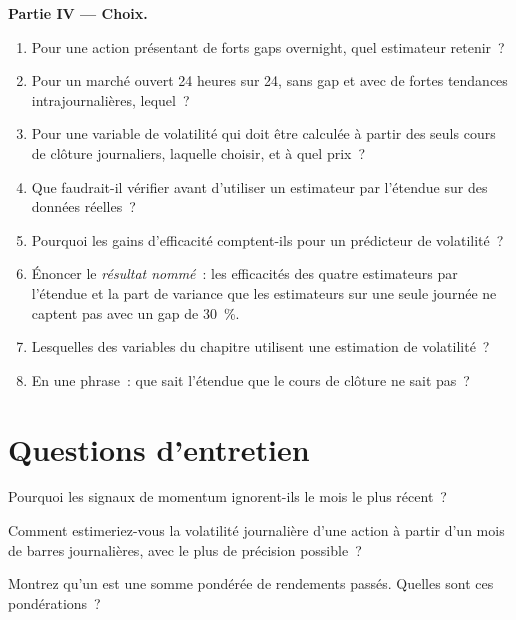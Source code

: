 \begin{problem}
\medskip\noindent\textbf{Partie IV --- Choix.}
\begin{enumerate}[resume]
\item Pour une action présentant de forts gaps overnight, quel estimateur retenir~?
\item Pour un marché ouvert 24 heures sur 24, sans gap et avec de fortes tendances intrajournalières, lequel~?
\item Pour une variable de volatilité qui doit être calculée à partir des seuls cours de clôture journaliers, laquelle choisir, et à quel prix~?
\item Que faudrait-il vérifier avant d'utiliser un estimateur par l'étendue sur des données réelles~?
\item Pourquoi les gains d'efficacité comptent-ils pour un prédicteur de volatilité~?
\item Énoncer le \emph{résultat nommé}~: les efficacités des quatre estimateurs par l'étendue et la part de variance que les estimateurs sur une seule journée ne captent pas
avec un gap de 30~\%.
\item Lesquelles des variables du chapitre utilisent une estimation de volatilité~?
\item En une phrase~: que sait l'étendue que le cours de clôture ne sait pas~?
\end{enumerate}
\end{problem}

\section{Questions d'entretien}

\begin{interviewq}\label{iq:rs:price-and-volume-features:1}
Pourquoi les signaux de momentum ignorent-ils le mois le plus récent~?
\end{interviewq}

\begin{interviewq}\label{iq:rs:price-and-volume-features:2}
Comment estimeriez-vous la volatilité journalière d'une action à partir d'un mois de barres journalières, avec le plus de précision possible~?
\end{interviewq}

\begin{interviewq}\label{iq:rs:price-and-volume-features:3}
Montrez qu'un  est une somme pondérée de rendements passés. Quelles sont ces pondérations~?
\end{interviewq}

